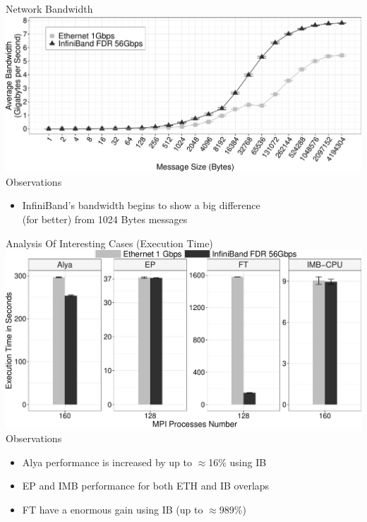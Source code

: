 \documentclass{beamer}
\begin{document}
\begin{frame}{Network Bandwidth}
\includegraphics[width=\textwidth]{SLIDES/img/Bandwidth.pdf}
\vfill\pause
\pause Observations
\begin{itemize}
    \item InfiniBand's bandwidth begins to show a big difference \\(for better) from 1024 Bytes messages
\end{itemize}
\end{frame}

\begin{frame}{Analysis Of Interesting Cases (Execution Time)}
\includegraphics[width=\textwidth]{SLIDES/img/FT-EP-Alya-IMB.pdf}
Observations
\begin{itemize}
    \pause\item Alya performance is increased by up to $\approx$16\% using IB
    \pause\item EP and IMB performance for both ETH and IB overlaps
    \pause\item FT have a enormous gain using IB (up to $\approx$989\%)
\end{itemize}
\end{frame}
\end{document}
